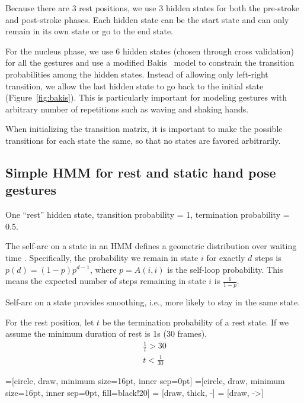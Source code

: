 Because there are 3 rest positions, we use 3 hidden states for both the pre-stroke and post-stroke phases.
Each hidden state can be the start state and can only remain in its own state or go to the end state.
 
For the nucleus phase, we use 6 hidden states (chosen through cross validation) for all the gestures and use a modified Bakis~\cite{bauer2000} model to constrain the transition probabilities
among the hidden states. Instead of allowing only left-right transition, we allow the last hidden state
to go back to the initial state (Figure~\ref{fig:bakis}). This is particularly important for modeling gestures with arbitrary number of
repetitions such as waving and shaking hands. 

When initializing the transition matrix, it is important to make the possible
transitions for each state the same, so that no states are favored arbitrarily.

\subsection{Simple HMM for rest and static hand pose gestures}
One ``rest'' hidden state, transition probability = 1, termination probability =
0.5.

The self-arc on a state in an HMM defines a geometric distribution over waiting
time \cite{murphy02}. Specifically, the probability we remain in state $i$ for
exactly $d$ steps is $p(d) = (1 - p)p^{d - 1}$, where $p = A(i, i)$ is the
self-loop probability. This means the expected number of steps remaining in
state $i$ is $\frac{1}{1 - p}$.

Self-arc on a state provides smoothing, i.e., more likely to stay in the same
state.

For the rest position, let $t$ be the termination probability of a rest state.
If we assume the minimum duration of rest is 1s (30 frames), 
\begin{align}
\frac{1}{t} > 30 \\
t < \frac{1}{30}
\end{align}

=[circle, draw, minimum size=16pt, inner sep=0pt]
=[circle, draw, minimum size=16pt, inner
sep=0pt, fill=black!20] 
 = [draw, thick, -]
 = [draw, ->]

